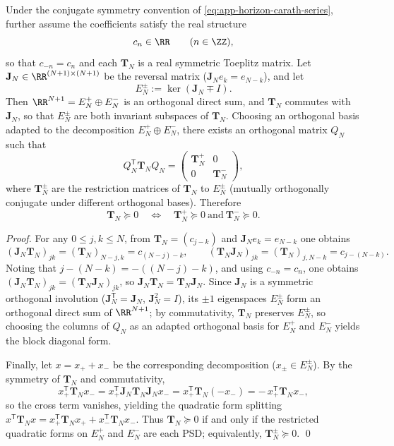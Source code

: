 \begin{proposition}\label{prop:app-horizon-toeplitz-z2-splitting}
Under the conjugate symmetry convention of \eqref{eq:app-horizon-carath-series}, further assume the coefficients satisfy the real structure
\[
c_n\in\RR\qquad(n\in\ZZ),
\]
so that \(c_{-n}=c_n\) and each \(\mathbf{T}_N\) is a real symmetric Toeplitz matrix.
Let \(\mathbf{J}_N\in\RR^{(N+1)\times(N+1)}\) be the reversal matrix (\( \mathbf{J}_N e_k=e_{N-k} \)), and let
\[
E_N^{\pm}:=\ker(\mathbf{J}_N\mp I).
\]
Then \( \RR^{N+1}=E_N^{+}\oplus E_N^{-} \) is an orthogonal direct sum, and \(\mathbf{T}_N\) commutes with \(\mathbf{J}_N\), so that \(E_N^{\pm}\) are both invariant subspaces of \(\mathbf{T}_N\).
Choosing an orthogonal basis adapted to the decomposition \(E_N^{+}\oplus E_N^{-}\), there exists an orthogonal matrix \(Q_N\) such that
\[
Q_N^{\mathsf T}\mathbf{T}_N Q_N
=
\begin{pmatrix}
\mathbf{T}_N^{+} & 0\\
0 & \mathbf{T}_N^{-}
\end{pmatrix},
\]
where \(\mathbf{T}_N^{\pm}\) are the restriction matrices of \(\mathbf{T}_N\) to \(E_N^{\pm}\) (mutually orthogonally conjugate under different orthogonal bases).
Therefore
\[
\mathbf{T}_N\succeq 0
\quad\Longleftrightarrow\quad
\mathbf{T}_N^{+}\succeq 0\ \text{and}\ \mathbf{T}_N^{-}\succeq 0.
\]
\end{proposition}

\begin{proof}
For any \(0\le j,k\le N\), from \(\mathbf{T}_N=(c_{j-k})\) and \(\mathbf{J}_N e_k=e_{N-k}\) one obtains
\[
(\mathbf{J}_N\mathbf{T}_N)_{jk}=(\mathbf{T}_N)_{N-j,k}=c_{(N-j)-k},
\qquad
(\mathbf{T}_N\mathbf{J}_N)_{jk}=(\mathbf{T}_N)_{j,N-k}=c_{j-(N-k)}.
\]
Noting that \(j-(N-k)=-( (N-j)-k)\), and using \(c_{-n}=c_n\), one obtains \((\mathbf{J}_N\mathbf{T}_N)_{jk}=(\mathbf{T}_N\mathbf{J}_N)_{jk}\), so \(\mathbf{J}_N\mathbf{T}_N=\mathbf{T}_N\mathbf{J}_N\).
Since \(\mathbf{J}_N\) is a symmetric orthogonal involution (\(\mathbf{J}_N^{\mathsf T}=\mathbf{J}_N\), \(\mathbf{J}_N^2=I\)), its \(\pm 1\) eigenspaces \(E_N^{\pm}\) form an orthogonal direct sum of \(\RR^{N+1}\); by commutativity, \(\mathbf{T}_N\) preserves \(E_N^{\pm}\), so choosing the columns of \(Q_N\) as an adapted orthogonal basis for \(E_N^{+}\) and \(E_N^{-}\) yields the block diagonal form.
\par
Finally, let \(x=x_{+}+x_{-}\) be the corresponding decomposition (\(x_{\pm}\in E_N^{\pm}\)). By the symmetry of \(\mathbf{T}_N\) and commutativity,
\[
x_{+}^{\mathsf T}\mathbf{T}_N x_{-}
=
x_{+}^{\mathsf T}\mathbf{J}_N\mathbf{T}_N\mathbf{J}_N x_{-}
=
x_{+}^{\mathsf T}\mathbf{T}_N(-x_{-})
=
-\,x_{+}^{\mathsf T}\mathbf{T}_N x_{-},
\]
so the cross term vanishes, yielding the quadratic form splitting
\(
x^{\mathsf T}\mathbf{T}_N x=x_{+}^{\mathsf T}\mathbf{T}_N x_{+}+x_{-}^{\mathsf T}\mathbf{T}_N x_{-}
\).
Thus \(\mathbf{T}_N\succeq 0\) if and only if the restricted quadratic forms on \(E_N^{+}\) and \(E_N^{-}\) are each PSD; equivalently, \(\mathbf{T}_N^{\pm}\succeq 0\). \qed
\end{proof}

